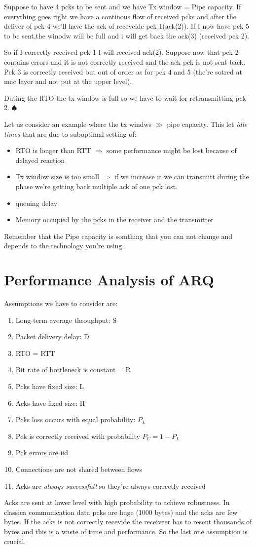 \begin{itemize}
Suppose to have 4 pcks to be sent and we have Tx window = Pipe capacity. If everything goes right we have a continous flow of received pcks and after the deliver of pck 4 we'll have the ack of receveide pck 1(ack(2)). If I now have pck 5 to be sent,the winodw will be full and i will get back the ack(3) (received pck 2). 

So if I correctly received pck 1 I will received ack(2). Suppose now that pck 2 contains errors and it is not correctly received and the ack pck is not sent back. Pck 3 is correctly received but out of order as for pck 4 and 5 (the're sotred at mac layer and not put at the upper level). 

Duting the RTO the tx window is full so we have to wait for retransmitting pck 2. 
$\spadesuit$

Let us consider an example where the tx windws $\gg$ pipe capacity. This let \emph{idle times} that are due to suboptimal setting of: 
\begin{itemize}
\item RTO is longer than RTT $\Rightarrow$ some performance might be lost because of delayed reaction
\item Tx window size is too small $\Rightarrow$ if we increase it we can transmitt during the phase we're getting back multiple ack of one pck lost. 
\item queuing delay
\item Memory occupied by the pcks in the receiver and the transmitter
\end{itemize}
Remember that the Pipe capacity is somthing that you can not change and depends to the technology you're using.

\section{Performance Analysis of ARQ}
Assumptions we have to consider are:
\begin{enumerate}
\item Long-term average throughput: S
\item Packet delivery delay: D
\item RTO = RTT
\item Bit rate of bottleneck is constant = R
\item Pcks have fixed size: L
\item Acks have fixed size: H 
\item Pcks loss occurs with equal probability: $P_L$
\item Pck is correctly received with probability $P_C = 1 - P_L$
\item Pck errors are iid
\item Connections are not shared between flows
\item Acks are \emph{always successfull} so they're always correctly received  
\end{enumerate} 
Acks are sent at lower level with high probability to achieve robustness. 
In classica communication data pcks are huge (1000 bytes) and the acks are few bytes. If the acks is not correctly recevide the receiveer has to resent thousands of bytes and this is a waste of time and performance. So the last one assumption is crucial.   
 

\end{itemize}
